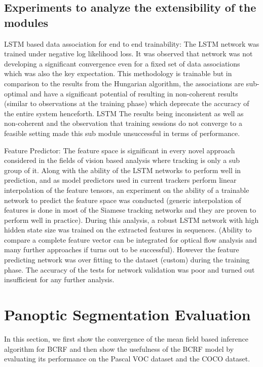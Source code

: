 \subsection{Experiments to analyze the extensibility of the modules}

LSTM based data association for end to end trainability: The LSTM network was trained under negative log likelihood loss. It was observed that network was not developing a significant convergence even for a fixed set of data associations which was also the key expectation. This methodology is trainable but in comparison to the results from the Hungarian algorithm, the associations are sub-optimal and have a significant potential of resulting in non-coherent results (similar to observations at the training phase) which deprecate the accuracy of the entire system henceforth. LSTM The results being inconsistent as well as non-coherent and the observation that training sessions do not converge to a feasible setting made this sub module unsuccessful in terms of performance.

Feature Predictor: The feature space is significant in every novel approach considered in the fields of vision based analysis where tracking is only a sub group of it. Along with the ability of the LSTM networks to perform well in prediction, and as model predictors used in current trackers perform linear interpolation of the feature tensors, an experiment on the ability of a trainable network to predict the feature space was conducted (generic interpolation of features is done in most of the Siamese tracking networks and they are proven to perform well in practice).
During this analysis, a robust LSTM network with high hidden state size was trained on the extracted features in sequences. (Ability to compare a complete feature vector can be integrated for optical flow analysis and many further approaches if turns out to be successful). However the feature predicting network was over fitting to the dataset (custom) during the training phase. The accuracy of the tests for network validation was poor and turned out insufficient for any further analysis.


\section{Panoptic Segmentation Evaluation}

In this section, we first show the convergence of the mean field based inference algorithm for BCRF and then show the usefulness of the BCRF model by evaluating its performance on the Pascal VOC dataset and the COCO dataset.

